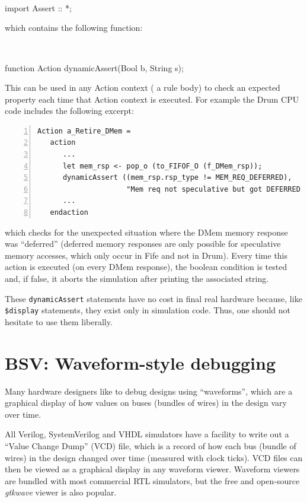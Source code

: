 {\tt
\begin{tabbing}
\hmmm import Assert :: *;
\end{tabbing}
}

which contains the following function:

{\tt
\begin{tabbing}
\hmmm function Action dynamicAssert(Bool b, String s);
\end{tabbing}
}

This can be used in any Action context ({\eg} a rule body) to check an
expected property each time that Action context is executed.  For
example the Drum CPU code includes the following excerpt:

{\small
\begin{Verbatim}[frame=single, numbers=left, label=src\_Drum/CPU.bsv]
   Action a_Retire_DMem =
   action
      ...
      let mem_rsp <- pop_o (to_FIFOF_O (f_DMem_rsp));
      dynamicAssert ((mem_rsp.rsp_type != MEM_REQ_DEFERRED),
                     "Mem req not speculative but got DEFERRED mem response");
      ...
   endaction
\end{Verbatim}
}

which checks for the unexpected situation where the DMem memory
response was ``deferred'' (deferred memory responses are only possible
for speculative memory accesses, which only occur in Fife and not in
Drum).  Every time this action is executed (on every DMem response),
the boolean condition is tested and, if false, it aborts the
simulation after printing the associated string.

These \verb|dynamicAssert| statements have no cost in final real
hardware because, like \verb|$display| statements, they exist only in
simulation code.  Thus, one should not hesitate to use them liberally.


\section{BSV: Waveform-style debugging}


Many hardware designers like to debug designs using ``waveforms'',
which are a graphical display of how values on buses (bundles of
wires) in the design vary over time.

All Verilog, SystemVerilog and VHDL simulators have a facility to
write out a ``Value Change Dump'' (VCD) file, which is a record of how
each bus (bundle of wires) in the design changed over time (measured
with clock ticks).  VCD files can then be viewed as a graphical
display in any waveform viewer.  Waveform viewers are bundled with
most commercial RTL simulators, but the free and open-source
\emph{gtkwave} viewer is also popular.

